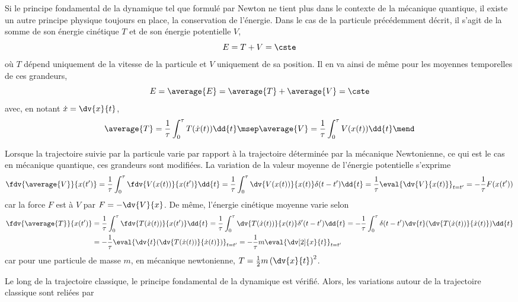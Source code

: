 \par Si le principe fondamental de la dynamique tel que formulé par Newton ne tient plus dans le contexte de la mécanique quantique, il existe un autre principe physique toujours en place, la conservation de l'énergie. Dans le cas de la particule précédemment décrit, il s'agit de la somme de son énergie cinétique $T$ et de son énergie potentielle $V$, \ie
\begin{equation}
E = T + V = \cste
\end{equation}
où $T$ dépend uniquement de la vitesse de la particule et $V$ uniquement de sa position. %
Il en va ainsi de même pour les moyennes temporelles de ces grandeurs,
\begin{equation}
E = \average{E} = \average{T} + \average{V} = \cste
\end{equation}
avec, en notant $\dot{x}=\dv{x}{t}$,
\begin{equation}
\average{T} = \frac{1}{\tau}\int_0^\tau T(\dot{x}(t)) \dd{t}
\msep
\average{V} = \frac{1}{\tau}\int_0^\tau V(x(t)) \dd{t}
\mend
\end{equation}
\par
Lorsque la trajectoire suivie par la particule varie par rapport à la trajectoire déterminée par la mécanique Newtonienne, ce qui est le cas en mécanique quantique, ces grandeurs sont modifiées.
La variation de la valeur moyenne de l'énergie potentielle s'exprime
\begin{equation}
\fdv{\average{V}}{x(t')}
= \frac{1}{\tau}\int_0^\tau \fdv{V(x(t))}{x(t')} \dd{t}
= \frac{1}{\tau}\int_0^\tau \dv{V(x(t))}{x(t)}\delta(t-t') \dd{t}
= \frac{1}{\tau}\eval{\dv{V}{x(t)}}_{t=t'}
= -\frac{1}{\tau}F(x(t'))
\end{equation}
car la force $F$ est à $V$ par $F = - \dv{V}{x}$.
De même, l'énergie cinétique moyenne varie selon
\begin{align}
\fdv{\average{T}}{x(t')}
&
= \frac{1}{\tau}\int_0^\tau \fdv{T(\dot{x}(t))}{x(t')} \dd{t}
=\frac{1}{\tau}\int_0^\tau \dv{T(\dot{x}(t))}{x(t)}\delta'(t-t') \dd{t}
=-\frac{1}{\tau}\int_0^\tau \delta(t-t') \dv{t}(\dv{T(\dot{x}(t))}{\dot{x}(t)}) \dd{t}
\nonumber
\\&
=-\frac{1}{\tau}\eval{\dv{t}(\dv{T(\dot{x}(t))}{\dot{x}(t)})}_{t=t'}
=-\frac{1}{\tau}m\eval{\dv[2]{x}{t}}_{t=t'}
\end{align}
car pour une particule de masse $m$, en mécanique newtonienne, $T = \frac{1}{2}m\left(\dv{x}{t}\right)^2$.
\par
Le long de la trajectoire classique, le principe fondamental de la dynamique est vérifié. Alors, les variations autour de la trajectoire classique sont reliées par
